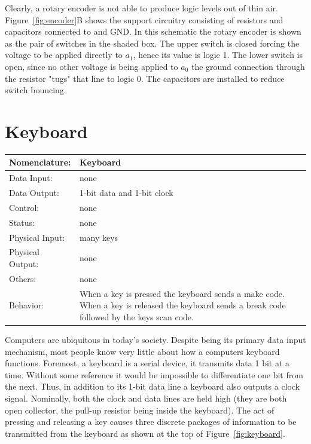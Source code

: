 Clearly, a rotary encoder is not able to produce logic levels out 
of thin air.   Figure~\ref{fig:encoder}B shows the support 
circuitry consisting of resistors and capacitors connected to 
\VCC and GND.  In this schematic the rotary encoder is shown as the
pair of switches in the shaded box.  The upper switch is closed
forcing the voltage \VCC to be applied directly to $a_1$, hence its
value is logic 1.  The lower switch is open, since no other voltage 
is being applied to $a_0$ the ground connection through the resistor 
"tugs" that line to logic 0.  The capacitors are installed to reduce 
switch bouncing.

\section{Keyboard}
\label{page:keyboad}
\begin{tabular}{|l|p{3.5in}|} \hline
Nomenclature:  & Keyboard                           \\ \hline
Data Input:    & none        \\ \hline
Data Output:   & 1-bit data and 1-bit clock   \\ \hline
Control:       & none           \\ \hline
Status:        & none                                   \\ \hline
Physical Input:& many keys		\\ \hline
Physical Output:& none		\\ \hline
Others:        & none                   \\ \hline
Behavior:      & When a key is pressed the keyboard sends a make code.
When a key is released the keyboard sends a break code followed by the
keys scan code. \\ \hline
\end{tabular}

Computers are ubiquitous in today's society.  Despite being its primary 
data input mechanism, most people know very little about how a computers
keyboard functions.  Foremost, a keyboard is a serial device, it transmits
data 1 bit at a time.  Without some reference it would be impossible
to differentiate one bit from the next.  Thus, in addition to its 1-bit
data line a keyboard also outputs a clock signal.  Nominally, both the
clock and data lines are held high (they are both open collector, the 
pull-up resistor being inside the keyboard).  The act of pressing and releasing 
a key causes three discrete packages of information to be transmitted from
the keyboard as shown at the top of Figure~\ref{fig:keyboard}.


